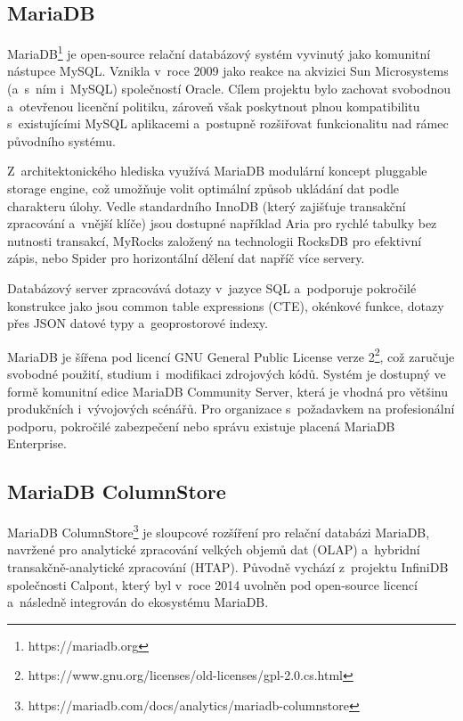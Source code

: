 \subsection{MariaDB}

MariaDB\footnote{https://mariadb.org} je open-source relační databázový systém vyvinutý jako komunitní nástupce MySQL. Vznikla v~roce 2009 jako reakce na akvizici Sun Microsystems (a~s~ním i~MySQL) společností Oracle. 
Cílem projektu bylo zachovat svobodnou a~otevřenou licenční politiku, zároveň však poskytnout plnou kompatibilitu s~existujícími MySQL aplikacemi a~postupně rozšiřovat funkcionalitu nad rámec původního systému.
\cite{mariadbdocs}

Z~architektonického hlediska využívá MariaDB modulární koncept pluggable storage engine, což umožňuje volit optimální způsob ukládání dat podle charakteru úlohy. 
Vedle standardního InnoDB (který zajišťuje transakční zpracování a~vnější klíče) jsou dostupné například Aria pro rychlé tabulky bez nutnosti transakcí, MyRocks založený na technologii RocksDB pro efektivní zápis, nebo Spider pro horizontální dělení dat napříč více servery.

Databázový server zpracovává dotazy v~jazyce SQL a~podporuje pokročilé konstrukce jako jsou common table expressions (CTE), okénkové funkce, dotazy přes JSON datové typy a~geoprostorové indexy.
\cite{mariadbdocs}

MariaDB je šířena pod licencí GNU General Public License verze 2\footnote{https://www.gnu.org/licenses/old-licenses/gpl-2.0.cs.html}, což zaručuje svobodné použití, studium i~modifikaci zdrojových kódů. 
Systém je dostupný ve formě komunitní edice MariaDB Community Server, která je vhodná pro většinu produkčních i~vývojových scénářů. 
Pro organizace s~požadavkem na profesionální podporu, pokročilé zabezpečení nebo správu existuje placená MariaDB Enterprise.

\subsection{MariaDB ColumnStore}
MariaDB ColumnStore\footnote{https://mariadb.com/docs/analytics/mariadb-columnstore} je sloupcové rozšíření pro relační databázi MariaDB, navržené pro analytické zpracování velkých objemů dat (OLAP) a~hybridní transakčně-analytické zpracování (HTAP). 
Původně vychází z~projektu InfiniDB společnosti Calpont, který byl v~roce 2014 uvolněn pod open-source licencí a~následně integrován do ekosystému MariaDB.
\cite{mariadbcolumnstore}

